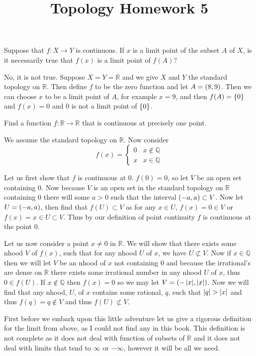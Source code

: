 \documentclass{article}
\title{Topology Homework 5}
\begin{document}
\maketitle

 Suppose that $f:X\to Y$ is continuous. If $x$ is a limit point of the subset $A$ of $X$, is it necessarily true that $f(x)$ is a limit point of $f(A)$?

No, it is not true. Suppose $X = Y = \mathbb R$ and we give $X$ and $Y$ the standard topology on $\mathbb R$. Then define $f$ to be the zero function and let $A = \left( {8} , {9} \right)$. Then we can choose $x$ to be a limit point of $A$, for example $x = 9$, and then $f(A) = \left\{ {0} \right\}$ and $f(x) = 0$ and $0$ is not a limit point of $\left\{ {0} \right\}$.

 Find a function $f:\mathbb R \to \mathbb R$ that is continuous at precisely one point.

We assume the standard topology on $\mathbb R$. Now consider $$f(x) = \begin{cases}0 & x \not\in \mathbb Q\\x & x \in \mathbb Q\end{cases}$$

Let us first show that $f$ is continuous at $0$. $f(0) = 0$, so let $V$ be an open set containing $0$. Now because $V$ is an open set in the standard topology on $\mathbb R$ containing $0$ there will some $a > 0$ such that the interval $\left( {-a} , {a} \right) \subset V$. Now let $U = \left( {-a} , {a} \right)$, then find that $f(U) \subset V$ as for any $x\in U$, $f(x) = 0 \in V$ or $f(x) = x \in U \subset V$. Thus by our definition of point continuity $f$ is continuous at the point $0$.

Let us now consider a point $x\not=0$ in $\mathbb R$. We will show that there exists some nhood $V$ of $f(x)$, such that for any nhood $U$ of $x$, we have $U \not\subset V$. Now if $x\in\mathbb Q$ then we will let $V$ be an nhood of $x$ not containing $0$ and because the irrational's are dense on $\mathbb R$ there exists some irrational number in any nhood $U$ of $x$, thus $0 \in f(U)$. If $x\not\in\mathbb Q$ then $f(x) = 0$ so we may let $V= \left( {-\left|{x}\right|} , {\left|{x}\right|} \right)$. Now we will find that any nhood, $U$, of $x$ contains some rational, $q$, such that $\left|{q}\right| > \left|{x}\right|$ and thus $f(q) = q \not\in V$ and thus $f(U)\not\subset V$.

 First before we embark upon this little adventure let us give a rigorous definition for the limit from above, as I could not find any in this book. This definition is not complete as it does not deal with function of subsets of $\mathbb R$ and it does not deal with limits that tend to $\infty$ or $-\infty$, however it will be all we need.
\end{document}
